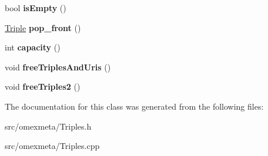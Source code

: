 \begin{DoxyCompactItemize}
\item 
\mbox{\label{classomexmeta_1_1Triples_a48ab93d0e38e3cfcb4eac9264b047f0a}} 
bool {\bfseries is\+Empty} ()
\item 
\mbox{\label{classomexmeta_1_1Triples_abb333b83c7a8ed1f210816ef88c8d3a0}} 
\hyperlink{classomexmeta_1_1Triple}{Triple} {\bfseries pop\+\_\+front} ()
\item 
\mbox{\label{classomexmeta_1_1Triples_a1f7ba9d5cd575ba5c63ed9dbbd1f279c}} 
int {\bfseries capacity} ()
\item 
\mbox{\label{classomexmeta_1_1Triples_a948ab12ded398518eefd408ce46596df}} 
void {\bfseries free\+Triples\+And\+Uris} ()
\item 
\mbox{\label{classomexmeta_1_1Triples_aa2fd811a68408c6fe6df560770cb974e}} 
void {\bfseries free\+Triples2} ()
\end{DoxyCompactItemize}


The documentation for this class was generated from the following files\+:\begin{DoxyCompactItemize}
\item 
src/omexmeta/Triples.\+h\item 
src/omexmeta/Triples.\+cpp\end{DoxyCompactItemize}
